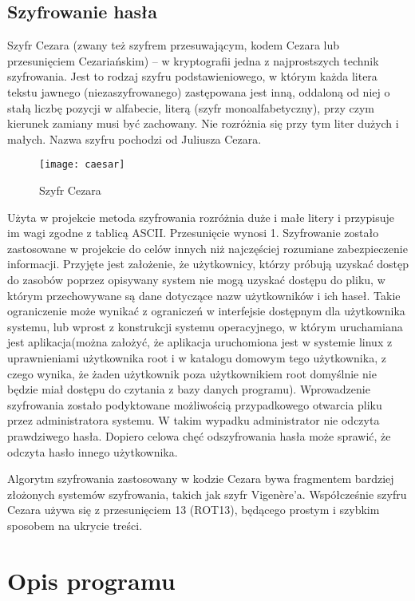 \documentclass[eng,printmode]{mgr}
\begin{document}
\section{Szyfrowanie hasła}

Szyfr Cezara (zwany też szyfrem przesuwającym, kodem Cezara lub przesunięciem Cezariańskim) – w kryptografii jedna z najprostszych technik szyfrowania. Jest to rodzaj szyfru podstawieniowego, w którym każda litera tekstu jawnego (niezaszyfrowanego) zastępowana jest inną, oddaloną od niej o stałą liczbę pozycji w alfabecie, literą (szyfr monoalfabetyczny), przy czym kierunek zamiany musi być zachowany. Nie rozróżnia się przy tym liter dużych i małych. Nazwa szyfru pochodzi od Juliusza Cezara.\cite{szyfrcezara}\\
\begin{figure}[placement h]
\texttt{[image: caesar]}
\caption{Szyfr Cezara}
\end{figure}

Użyta w projekcie metoda szyfrowania rozróżnia duże i małe litery i przypisuje im wagi zgodne z tablicą ASCII. Przesunięcie wynosi 1. Szyfrowanie zostało zastosowane w projekcie do celów innych niż najczęściej rozumiane zabezpieczenie informacji. Przyjęte jest założenie, że użytkownicy, którzy próbują uzyskać dostęp do zasobów poprzez opisywany system nie mogą uzyskać dostępu do pliku, w którym przechowywane są dane dotyczące nazw użytkowników i ich haseł. Takie ograniczenie może wynikać z ograniczeń w interfejsie dostępnym dla użytkownika systemu, lub wprost z konstrukcji systemu operacyjnego, w którym uruchamiana jest aplikacja(można założyć, że aplikacja uruchomiona jest w systemie linux z uprawnieniami użytkownika root i w katalogu domowym tego użytkownika, z czego wynika, że żaden użytkownik poza użytkownikiem root domyślnie nie będzie miał dostępu do czytania z bazy danych programu). Wprowadzenie szyfrowania zostało podyktowane możliwością przypadkowego otwarcia pliku przez administratora systemu. W takim wypadku administrator nie odczyta prawdziwego hasła. Dopiero celowa chęć odszyfrowania hasła może sprawić, że odczyta hasło innego użytkownika.

Algorytm szyfrowania zastosowany w kodzie Cezara bywa fragmentem bardziej złożonych systemów szyfrowania, takich jak szyfr Vigenère'a. Współcześnie szyfru Cezara używa się z przesunięciem 13 (ROT13), będącego prostym i szybkim sposobem na ukrycie treści.
\chapter{Opis programu}
\end{document}
